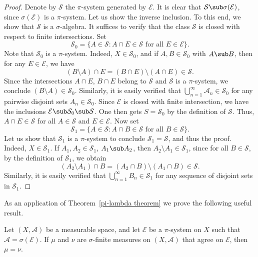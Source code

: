 \begin{proof}
Denote by $\mathcal{S}$ the $\pi$-system generated by $\mathcal{E}$. It is clear that $\mathcal{S}\sub\sigma(\mathcal{E})$, since $\sigma(\mathcal{E})$ is a $\pi$-system. Let us show the inverse inclusion. To this end, we show that $\mathcal{S}$ is a $\sigma$-algebra. It suffices to verify that the class $\mathcal{S}$ is closed with respect to finite intersections. Set
\[\mathcal{S}_0=\{A\in\mathcal{S}:A\cap E\in\mathcal{S}\text{ for all }E\in\mathcal{E}\}.\]
Note that $\mathcal{S}_0$ is a $\pi$-system. Indeed, $X\in\mathcal{S}_0$, and if $A,B\in\mathcal{S}_0$ with $A\sub B$, then for any $E\in\mathcal{E}$, we have
\[(B\setminus A)\cap E=(B\cap E)\setminus(A\cap E)\in\mathcal{S}.\]
Since the intersections $A\cap E$, $B\cap E$ belong to $\mathcal{S}$ and $\mathcal{S}$ is a $\pi$-system, we conclude $(B\setminus A)\in\mathcal{S}_0$. Similarly, it is easily verified that $\bigcup_{n=1}^{\infty}\mathcal{A}_n\in\mathcal{S}_0$ for any pairwise disjoint sets $A_n\in\mathcal{S}_0$. Since $\mathcal{E}$ is closed with finite intersection, we have the inclusions $\mathcal{E}\sub\mathcal{S}_0\sub\mathcal{S}$. One then gets $S=\mathcal{S}_0$ by the definition of $\mathcal{S}$. Thus, $A\cap E\in\mathcal{S}$ for all $A\in\mathcal{S}$ and $E\in\mathcal{E}$. Now set
\[\mathcal{S}_1=\{A\in\mathcal{S}:A\cap B\in\mathcal{S}\text{ for all $B\in\mathcal{S}$}\}.\]
Let us show that $\mathcal{S}_1$ is a $\pi$-system to conclude $\mathcal{S}_1=\mathcal{S}$, and thus the proof. Indeed, $X\in\mathcal{S}_1$. If $A_1,A_2\in\mathcal{S}_1$, $A_1\sub A_2$, then $A_2\setminus A_1\in\mathcal{S}_1$, since for all $B\in\mathcal{S}$, by the definition of $\mathcal{S}_1$, we obtain 
\[(A_2\setminus A_1)\cap B=(A_2\cap B)\setminus(A_1\cap B)\in\mathcal{S}.\]
Similarly, it is easily verified that $\bigcup_{n=1}^{\infty}B_n\in\mathcal{S}_1$ for any sequence of disjoint sets in $\mathcal{S}_1$.
\end{proof}
As an application of Theorem~\ref{pi-lambda theorem} we prove the following useful result.
\begin{proposition}\label{measure coincide on finite inter class}
Let $(X,\mathcal{A})$ be a measurable space, and let $\mathcal{E}$ be a $\pi$-system on $X$ such that $\mathcal{A}=\sigma(\mathcal{E})$. If $\mu$ and $\nu$ are $\sigma$-finite measures on $(X,\mathcal{A})$ that agree on $\mathcal{E}$, then $\mu=\nu$.
\end{proposition}
